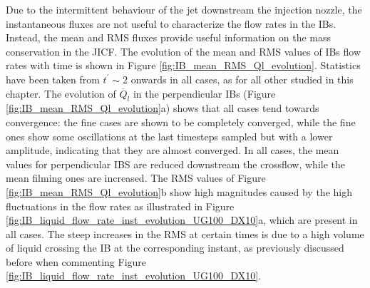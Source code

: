 Due to the intermittent behaviour of the jet downstream the injection nozzle, the instantaneous fluxes are not useful to characterize the flow rates in the IBs. Instead, the mean and RMS fluxes provide useful information on the mass conservation in the JICF. The evolution of the mean and RMS values of IBs flow rates with time is shown in Figure \ref{fig:IB_mean_RMS_Ql_evolution}. Statistics have been taken from $t^{\prime} \sim 2$ onwards in all cases, as for all other studied in this chapter. The evolution of $\overline{Q}_l$ in the perpendicular IBs (Figure \ref{fig:IB_mean_RMS_Ql_evolution}a) shows that all cases tend towards convergence: the fine cases are shown to be completely converged, while the fine ones show some oscillations at the last timesteps sampled but with a lower amplitude, indicating that they are almost converged. In all cases, the mean values for perpendicular IBS are reduced downstream the crossflow, while the mean filming ones are increased. The RMS values of Figure \ref{fig:IB_mean_RMS_Ql_evolution}b show high magnitudes caused by the high fluctuations in the flow rates as illustrated in Figure \ref{fig:IB_liquid_flow_rate_inst_evolution_UG100_DX10}a, which are present in all cases. The steep increases in the RMS at certain times is due to a high volume of liquid crossing the IB at the corresponding instant, as previously discussed before when commenting Figure \ref{fig:IB_liquid_flow_rate_inst_evolution_UG100_DX10}.


\clearpage


